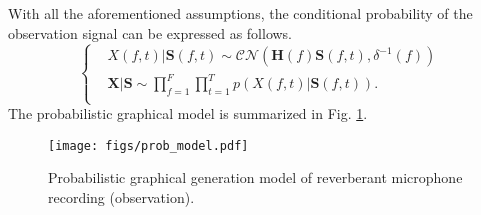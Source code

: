 With all the aforementioned assumptions, the conditional probability of the observation signal can be expressed as follows.
\begin{equation}
\left\{
\begin{aligned}
    &X(f,t)|\mathbf{S}(f,t)\sim\mathcal{CN}\left(\mathbf{H}(f)\mathbf{S}(f,t),\delta^{-1}(f)\right) \\
    &\mathbf{X}|\mathbf{S}\sim\prod_{f=1}^F\prod_{t=1}^T p\left(X(f,t)|\mathbf{S}(f,t)\right).\\
\end{aligned}
\right.
\end{equation}
The probabilistic graphical model is summarized in Fig. \ref{fig:prob_model}.
\begin{figure}[t]
    \centering
    \texttt{[image: figs/prob\_model.pdf]}
    \caption{Probabilistic graphical generation model of reverberant microphone recording (observation).}
    \label{fig:prob_model}
\end{figure}




% 
% 


